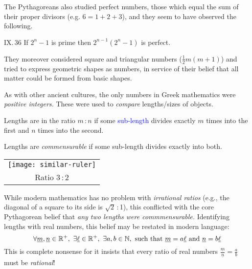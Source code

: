 The Pythagoreans also studied perfect numbers, those which equal the sum of their proper divisors (e.g. $6=1+2+3$), and they seem to have observed the following.

\begin{thm*}{IX.\,36}{}
	If $2^n-1$ is prime then $2^{n-1}(2^n-1)$ is perfect.
\end{thm*}

They moreover considered square and triangular numbers ($\frac 12m(m+1)$) and tried to express geometric shapes as numbers, in service of their belief that all matter could be formed from basic shapes.%
\vspace{-5pt}




As with other ancient cultures, the only numbers in Greek mathematics were \emph{positive integers.} These were used to \emph{compare} lengths/sizes of objects.

\begin{defn*}[lower separated=false, sidebyside, sidebyside align=top seam, sidebyside gap=0pt, righthand width=0.19\linewidth]{}{}
	Lengths are in the ratio $m$\,:\,$n$ if some \textcolor{blue}{sub-length} divides exactly $m$ times into the first and $n$ times into the second.\par
	Lengths are \emph{commensurable} if some sub-length divides exactly into both.
	\tcblower
	\flushright
	\begin{tabular}{c@{}}
		\texttt{[image: similar-ruler]}\\
		Ratio 3\,:\,2
	\end{tabular}
\end{defn*}

While modern mathematics has no problem with \emph{irrational ratios} (e.g., the diagonal of a square to its side is $\sqrt 2$\,:\,1), this conflicted with the core Pythagorean belief that \emph{any two lengths were commmensurable.} Identifying lengths with real numbers, this belief may be restated in modern language:
\[
	\forall \underline{m},\underline n\in\R^+,\ \exists \underline\ell\in\R^+,\ \exists a,b\in\N,\ \text{such that}\ \underline m=a\underline\ell\ \text{and}\ \underline n=b\underline\ell
\]
This is complete nonsense for it insists that every ratio of real numbers $\frac{\underline m}{\underline n}=\frac ab$ must be \emph{rational}!\smallbreak

